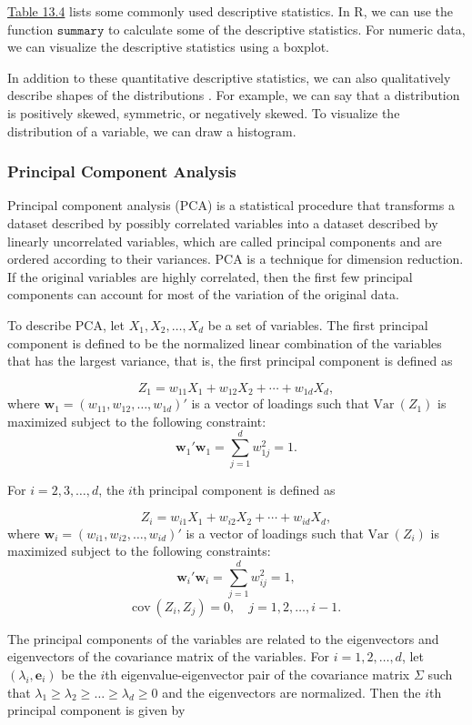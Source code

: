 \documentclass[]{book}
\theoremstyle{definition}
\theoremstyle{definition}
\theoremstyle{definition}
\theoremstyle{remark}
\begin{document}
\protect\hyperlink{tab:13.4}{Table 13.4} lists some commonly used
descriptive statistics. In R, we can use the function
\(\texttt{summary}\) to calculate some of the descriptive statistics.
For numeric data, we can visualize the descriptive statistics using a
boxplot.

In addition to these quantitative descriptive statistics, we can also
qualitatively describe shapes of the distributions \citep{bluman2012}.
For example, we can say that a distribution is positively skewed,
symmetric, or negatively skewed. To visualize the distribution of a
variable, we can draw a histogram.

\subsubsection{Principal Component
Analysis}\label{principal-component-analysis}

Principal component analysis (PCA) is a statistical procedure that
transforms a dataset described by possibly correlated variables into a
dataset described by linearly uncorrelated variables, which are called
principal components and are ordered according to their variances. PCA
is a technique for dimension reduction. If the original variables are
highly correlated, then the first few principal components can account
for most of the variation of the original data.

To describe PCA, let \(X_1,X_2,\ldots,X_d\) be a set of variables. The
first principal component is defined to be the normalized linear
combination of the variables that has the largest variance, that is, the
first principal component is defined as

\[Z_1=w_{11} X_1 + w_{12} X_2 + \cdots + w_{1d} X_d,\] where
\(\textbf{w}_1=(w_{11}, w_{12}, \ldots, w_{1d})'\) is a vector of
loadings such that \(\mathrm{Var~}{(Z_1)}\) is maximized subject to the
following constraint:
\[\textbf{w}_1'\textbf{w}_1 = \sum_{j=1}^d w_{1j}^2 = 1.\]

For \(i=2,3,\ldots,d\), the \(i\)th principal component is defined as

\[Z_i=w_{i1} X_1 + w_{i2} X_2 + \cdots + w_{id} X_d,\] where
\(\textbf{w}_i=(w_{i1}, w_{i2}, \ldots, w_{id})'\) is a vector of
loadings such that \(\mathrm{Var~}{(Z_i)}\) is maximized subject to the
following constraints:
\[\textbf{w}_i'\textbf{w}_i=\sum_{j=1}^d w_{ij}^2 = 1,\]
\[\mathrm{cov~}{(Z_i, Z_j)} = 0,\quad j=1,2,\ldots,i-1.\]

The principal components of the variables are related to the
eigenvectors and eigenvectors of the covariance matrix of the variables.
For \(i=1,2,\ldots,d\), let \((\lambda_i, \textbf{e}_i)\) be the \(i\)th
eigenvalue-eigenvector pair of the covariance matrix \({\Sigma}\) such
that \(\lambda_1\ge \lambda_2\ge \ldots\ge \lambda_d\ge 0\) and the
eigenvectors are normalized. Then the \(i\)th principal component is
given by
\end{document}
